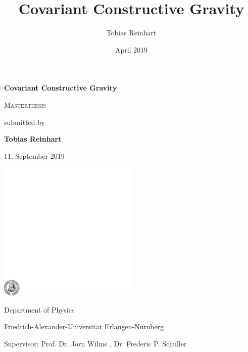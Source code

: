 \documentclass[a4paper,12pt, DIV=14, BCOR=5mm, twoside, headsepline, numbers=noenddot]{scrbook}
\title{Covariant Constructive Gravity}
\author{Tobias Reinhart }
\date{April 2019}
\begin{document}
\frontmatter

\begin{titlepage}
	\centering

	{\Huge\bfseries Covariant Constructive Gravity\par}
	\vspace{2cm}
	
	{\scshape\Large Masterthesis \par}
	\vspace{1cm}
	{ submitted by \par}
	
	
	
	{\bfseries Tobias Reinhart\par}
		{ 11. September 2019\par}
	\vspace{2cm}
	
	\includegraphics[width=0.5\textwidth]{fau-siegel.pdf}\par
	\vspace{1cm}Department of Physics\par
	Friedrich-Alexander-Universität Erlangen-Nürnberg\par
	Supervisor: Prof. Dr. Jörn Wilms , Dr. Frederic P. Schuller
	
	\vfill
\end{titlepage}
\end{document}

